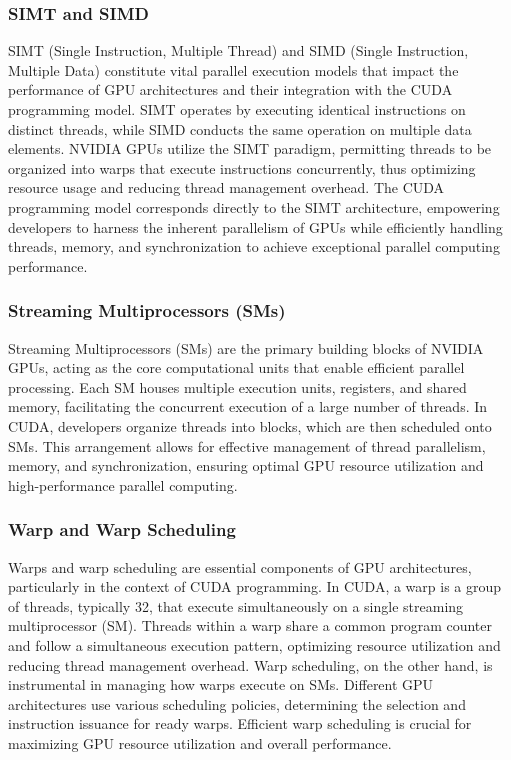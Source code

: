 \subsubsection{SIMT and SIMD}
\label{sec:simdandsimt}

SIMT (Single Instruction, Multiple Thread) and SIMD (Single Instruction, Multiple Data) 
constitute vital parallel execution models that impact the performance of GPU architectures
and their integration with the CUDA programming model. SIMT operates by executing identical 
instructions on distinct threads, while SIMD conducts the same operation on multiple data elements. 
NVIDIA GPUs utilize the SIMT paradigm, permitting threads to be organized into warps that 
execute instructions concurrently, thus optimizing resource usage and reducing thread management 
overhead\cite{cuda2016best}. The CUDA programming model corresponds directly to the SIMT architecture, empowering developers 
to harness the inherent parallelism of GPUs while efficiently handling threads, memory, and 
synchronization to achieve exceptional parallel computing performance.

\subsubsection{Streaming Multiprocessors (SMs)}
\label{sec:sm}

Streaming Multiprocessors (SMs) are the primary building blocks of NVIDIA GPUs, acting as the core 
computational units that enable efficient parallel processing. Each SM houses multiple execution 
units, registers, and shared memory, facilitating the concurrent execution of a large number of threads. 
In CUDA, developers organize threads into blocks, which are then scheduled onto SMs\cite{cuda2016best}. This arrangement 
allows for effective management of thread parallelism, memory, and synchronization, ensuring optimal GPU 
resource utilization and high-performance parallel computing.

\subsubsection{Warp and Warp Scheduling}
\label{sec:warp}

Warps and warp scheduling are essential components of GPU architectures, particularly in the context 
of CUDA programming. In CUDA, a warp is a group of threads, typically 32, that execute simultaneously 
on a single streaming multiprocessor (SM). Threads within a warp share a common program counter and 
follow a simultaneous execution pattern, optimizing resource utilization and reducing thread management 
overhead. Warp scheduling, on the other hand, is instrumental in managing how warps execute on SMs. 
Different GPU architectures use various scheduling policies, determining the selection and instruction 
issuance for ready warps\cite{cuda2016best}. Efficient warp scheduling is crucial for maximizing GPU resource utilization 
and overall performance.


